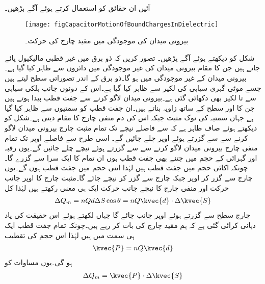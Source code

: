 آئیں ان حقائق کو استعمال کرتے ہوئے آگے بڑھیں۔
\begin{figure}
\centering
\texttt{[image: figCapacitorMotionOfBoundChargesInDielectric]}
\caption{بیرونی میدان کی موجودگی میں مقید چارج کی حرکت۔}
\label{شکل_کپیسٹر_مقید_چارج_حرکت}
\end{figure}

شکل   کو دیکھتے ہوئے آگے پڑھیں۔ تصور کریں کہ ذو برق میں غیر قطبی مالیکیول پائے جاتے ہیں جن کا مقام بیرونی میدان کی غیر موجودگی میں دائروں سے ظاہر کیا گیا ہے۔بیرونی میدان کے غیر موجودگی میں  ہو گا۔ذو برق کے اندر تصوراتی سطح  لیتے ہیں جسے موٹی گہری سیاہی کی لکیر سے ظاہر کیا گیا ہے۔اس کے دونوں جانب ہلکی سیاہی سے  تا  لکیر بھی دکھائی گئی ہے۔بیرونی میدان لاگو کرنے سے  جفت قطب  پیدا ہوتے ہیں  جن کا  اور  سطح   کے ساتھ  زاویہ بناتے ہیں۔ان جفت قطب کو سمتیوں سے ظاہر کیا گیا ہے جہاں سمتیہ کی نوک مثبت جبکہ اس کی دم منفی چارج کا مقام دیتی ہے۔شکل کو دیکھتے ہوئے صاف ظاہر ہے  کہ  سے  فاصلے نیچے  تک تمام مثبت چارج بیرونی میدان لاگو کرنے سے   سے گزرتے ہوئے  اوپر چلے جائیں گے۔ اسی طرح  سے  فاصلے اوپر  تک تمام منفی چارج بیرونی میدان لاگو کرنے سے   سے گزرتے ہوئے  نیچے چلے جائیں گے۔یوں  رقبہ اور  گہرائی کے حجم  میں جتنے بھی جفت قطب ہوں ان تمام کا ایک سرا  سے گزرے گا۔چونکہ اکائی حجم میں  جفت قطب ہیں لہٰذا اتنی حجم میں  جفت قطب ہوں گے۔یوں  چارج  سے گزر کر اوپر  جبکہ  چارج  سے گزر کر نیچے جائے گا۔مثبت چارج کا اوپر جانب حرکت اور منفی چارج کا نیچے جانب حرکت ایک ہی معنی رکھتے ہیں لہٰذا  کل 
\begin{align}\label{مساوات_کپیسٹر_مقید_چارج_الف}
\Delta Q_m=nQd \Delta S \cos \theta=n Q  \kvec{d} \cdot \Delta \kvec{S}
\end{align}
چارج سطح سے گزرتے ہوئے اوپر جانب جائے گا جہاں  لکھتے ہوئے اس حقیقت کی یاد دہانی کرائی گئی ہے کہ ہم مقید چارج کی بات کر رہے ہیں۔چونکہ تمام جفت قطب ایک ہی سمت میں ہیں لہٰذا اس حجم کی تقطیب
\begin{align}
\kvec{P}=nQ\kvec{d}
\end{align}
ہو گی۔یوں مساوات  کو
\begin{align}\label{مساوات_کپیسٹر_مقید_چارج_ب}
\Delta Q_m=\kvec{P} \cdot \Delta \kvec{S}
\end{align}
